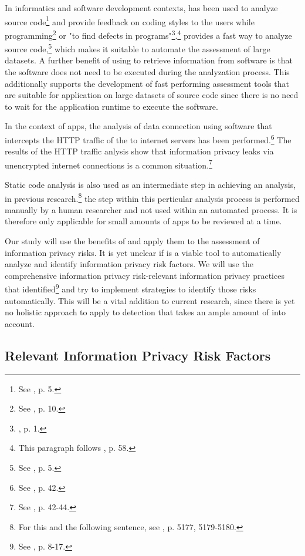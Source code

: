 In informatics and software development contexts, \sca has been used to analyze source code\footnote{See \cite{Haris2014}, p.  5.} and provide feedback on coding styles to the users while programming\footnote{See \cite{Bardas2010}, p. 10.} or "to find defects in programs"\footnote{\cite{Bardas2010}, p. 1.}.\footnote{This paragraph follows \cite{Louridas2006}, p. 58.}
\Sca provides a fast way to analyze source code,\footnote{See \cite{Bardas2010}, p. 5.} which makes it suitable to automate the assessment of large datasets.
A further benefit of using \sca to retrieve information from software is that the software does not need to be executed during the analyzation process.
This additionally supports the development of fast performing assessment tools that are suitable for application on large datasets of source code since there is no need to wait for the application runtime to execute the software.

In the context of \mH apps, the analysis of data connection using software that intercepts the HTTP traffic of the \mH to internet servers has been performed.\footnote{See \cite{Mense2015}, p. 42.}
The results of the HTTP traffic anlysis show that information privacy leaks via unencrypted internet connections is a common situation.\footnote{See \cite{Mense2015}, p. 42-44.}

Static code analysis is also used as an intermediate step in achieving an \ipr analysis, in previous research.\footnote{For this and the following sentence, see \cite{Dorazio2015}, p. 5177, 5179-5180.}
the \sca step within this perticular analysis process is performed manually by a human researcher and not used within an automated process.
It is therefore only applicable for small amounts of apps to be reviewed at a time.

Our study will use the benefits of \sca and apply them to the assessment of \mH information privacy risks.
It is yet unclear if \sca is a viable tool to automatically analyze and identify information privacy risk factors.
We will use the comprehensive information privacy risk-relevant information privacy practices that \cite{Dehling2016} identified\footnote{See \cite{Dehling2016}, p. 8-17.} and try to implement \sca strategies to identify those risks automatically.
This will be a vital addition to current research, since there is yet no holistic approach to apply \sca to \ipr detection that takes an ample amount of \iprfs into account.

\subsection{Relevant Information Privacy Risk Factors}\label{chapter:Relevant}

